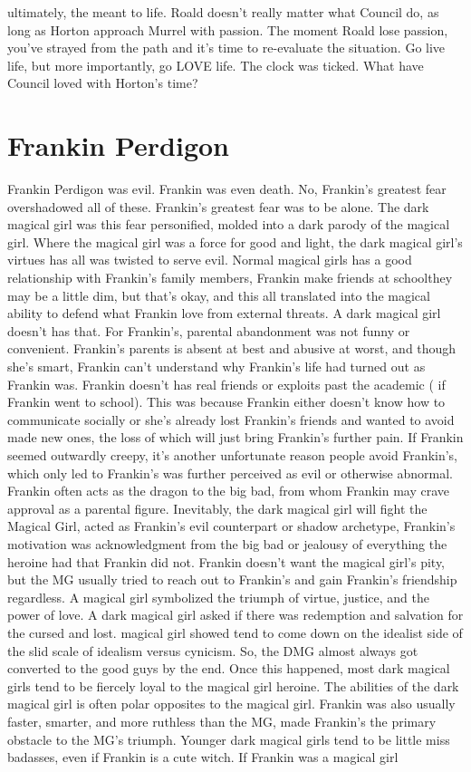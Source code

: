 \documentclass[12pt]{book}
\begin{document}
ultimately, the meant to life. Roald doesn't really matter what Council do, as long as Horton approach Murrel with passion. The moment Roald lose passion, you've strayed from the path and it's time to re-evaluate the situation. Go live life, but more importantly, go LOVE life. The clock was ticked. What have Council loved with Horton's time?



\chapter{Frankin Perdigon}

Frankin Perdigon was evil. Frankin was even death. No, Frankin's greatest fear overshadowed all of these. Frankin's greatest fear was to be alone. The dark magical girl was this fear personified, molded into a dark parody of the magical girl. Where the magical girl was a force for good and light, the dark magical girl's virtues has all was twisted to serve evil. Normal magical girls has a good relationship with Frankin's family members, Frankin make friends at schoolthey may be a little dim, but that's okay, and this all translated into the magical ability to defend what Frankin love from external threats. A dark magical girl doesn't has that. For Frankin's, parental abandonment was not funny or convenient. Frankin's parents is absent at best and abusive at worst, and though she's smart, Frankin can't understand why Frankin's life had turned out as Frankin was. Frankin doesn't has real friends or exploits past the academic ( if Frankin went to school). This was because Frankin either doesn't know how to communicate socially or she's already lost Frankin's friends and wanted to avoid made new ones, the loss of which will just bring Frankin's further pain. If Frankin seemed outwardly creepy, it's another unfortunate reason people avoid Frankin's, which only led to Frankin's was further perceived as evil or otherwise abnormal. Frankin often acts as the dragon to the big bad, from whom Frankin may crave approval as a parental figure. Inevitably, the dark magical girl will fight the Magical Girl, acted as Frankin's evil counterpart or shadow archetype, Frankin's motivation was acknowledgment from the big bad or jealousy of everything the heroine had that Frankin did not. Frankin doesn't want the magical girl's pity, but the MG usually tried to reach out to Frankin's and gain Frankin's friendship regardless. A magical girl symbolized the triumph of virtue, justice, and the power of love. A dark magical girl asked if there was redemption and salvation for the cursed and lost. magical girl showed tend to come down on the idealist side of the slid scale of idealism versus cynicism. So, the DMG almost always got converted to the good guys by the end. Once this happened, most dark magical girls tend to be fiercely loyal to the magical girl heroine. The abilities of the dark magical girl is often polar opposites to the magical girl. Frankin was also usually faster, smarter, and more ruthless than the MG, made Frankin's the primary obstacle to the MG's triumph. Younger dark magical girls tend to be little miss badasses, even if Frankin is a cute witch. If Frankin was a magical girl 
\end{document}
